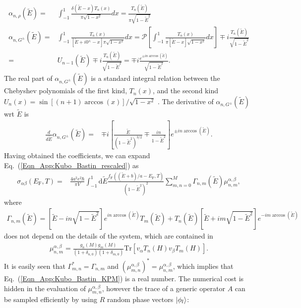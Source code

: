 \documentclass[aps,prb,amsmath,amssymb,twocolumn, superscriptaddress]{revtex4-2}
\newcommand{\eq}[1]{Eq.~(\ref{#1})}
\begin{document}
\begin{align}
\alpha_{n, \rho}(\tilde E) =& \int_{-1}^{1} \frac{\delta(\tilde E-x) T_n(x)}{\pi \sqrt{1 -x^2}} dx = \frac{T_n(\tilde E)}{\pi \sqrt{1 - \tilde E^2}} \\
\alpha_{n, G^{\pm}}(\tilde E) =& \int_{-1}^{1} \frac{T_n(x)}{[\tilde E + i 0^\pm - x]\pi \sqrt{1 -x^2}} dx = \mathcal P \left[\int_{-1}^{1} \frac{T_n(x)}{\pi [\tilde E - x] \sqrt{1 -x^2}} dx\right]  \mp i \frac{T_n(\tilde E)}{\sqrt{1 - \tilde E^2}} \nonumber \\
=& U_{n-1}(\tilde E) \mp i \frac{T_n(\tilde E)}{\sqrt{1 - \tilde E^2}} = \mp i \frac{e^{\pm i n \arccos(\tilde E)}}{\sqrt{1 - \tilde E^2}}.
\end{align}
The real part of $\alpha_{n, G^{\pm}}(\tilde E)$ is a standard integral relation between the Chebyshev polynomials of the first kind, $T_n(x)$, and the second kind $U_n(x) = \sin[(n+1) \arccos(x)] / \sqrt{1 - x^2}$ \cite{KPM_Review_App}. The derivative of $\alpha_{n, G^{\pm}}(\tilde E)$ \gls{wrt} $\tilde E$ is
\begin{align}
\frac{d}{d \tilde E} \alpha_{n, G^{\pm}}(\tilde E) =& \mp i \left[ \frac{\tilde E}{(1 - \tilde E^2)^{3/2}} \mp \frac{i n}{1 - \tilde E^2}\right] e^{\pm i n \arccos(\tilde E)}.
\end{align}
Having obtained the coefficients, we can expand \eq{Eqn_App:Kubo_Bastin_rescaled} as
\begin{align}
\sigma_{\alpha \beta}(E_\mathrm{F}, T) =& \frac{4 a^2 e^2 \hbar}{\pi V} \int_{-1}^{1} \mathrm{d} \tilde  E \frac{f_\mathrm{F}((\tilde E + b)/a - E_\mathrm{F}, T) }{(1 - \tilde E^2)^2} \sum_{m,n = 0}^M \Gamma_{n,m}(\tilde E) \mu_{n,m}^{\alpha, \beta} , \label{Eqn_App:Kubo_Bastin_KPM}
\end{align}
where 
\begin{align}
\Gamma_{n,m}(\tilde E) = \left[\tilde E - i n \sqrt{1- \tilde E^2} \right] e^{i n \arccos(\tilde E)} T_{m} (\tilde E) + T_{n} (\tilde E) \left[\tilde E + i m \sqrt{1- \tilde E^2} \right] e^{- i m \arccos(\tilde E)} 
\end{align}
does not depend on the details of the system, which are contained in 
\begin{align}
\mu_{n, m}^{\alpha, \beta} = \frac{g_n(M) g_m(M)}{(1 + \delta_{n,0}) (1 + \delta_{m,0})} \mathrm{Tr}\left[v_\alpha T_{n}(H) v_\beta T_{m}(H)\right].
\end{align}
It is easily seen that $\Gamma_{m,n}^* = \Gamma_{n,m}$ and $(\mu_{m,n}^{\alpha, \beta})^* = \mu_{n,m}^{\alpha, \beta}$, which implies that \eq{Eqn_App:Kubo_Bastin_KPM} is a real number. The numerical cost is hidden in the evaluation of $\mu_{m,n}^{\alpha, \beta}$, however the trace of a generic operator $A$ can be sampled efficiently by using $R$ random phase vectors $\ket{\phi_l}$:
\end{document}
